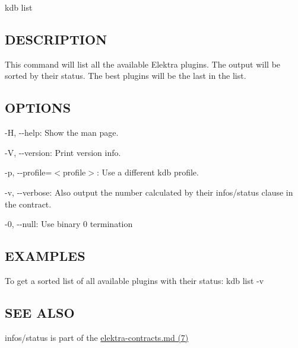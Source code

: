{\ttfamily kdb list}

\subsection*{D\+E\+S\+C\+R\+I\+P\+T\+I\+O\+N}

This command will list all the available Elektra plugins. The output will be sorted by their status. The best plugins will be the last in the list.

\subsection*{O\+P\+T\+I\+O\+N\+S}


\begin{DoxyItemize}
\item {\ttfamily -\/\+H}, {\ttfamily -\/-\/help}\+: Show the man page.
\item {\ttfamily -\/\+V}, {\ttfamily -\/-\/version}\+: Print version info.
\item {\ttfamily -\/p}, {\ttfamily -\/-\/profile}=$<$profile$>$\+: Use a different kdb profile.
\item {\ttfamily -\/v}, {\ttfamily -\/-\/verbose}\+: Also output the number calculated by their {\ttfamily infos/status} clause in the contract.
\item {\ttfamily -\/0}, {\ttfamily -\/-\/null}\+: Use binary 0 termination
\end{DoxyItemize}

\subsection*{E\+X\+A\+M\+P\+L\+E\+S}

To get a sorted list of all available plugins with their status\+: {\ttfamily kdb list -\/v}

\subsection*{S\+E\+E A\+L\+S\+O}


\begin{DoxyItemize}
\item {\ttfamily infos/status} is part of the \hyperlink{md_doc_help_elektra-contracts_doc_help_elektra-contracts_md}{elektra-\/contracts.md (7)} 
\end{DoxyItemize}